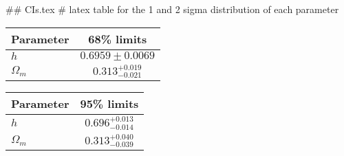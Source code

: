 ## CIs.tex
# latex table for the 1 and 2 sigma distribution of each parameter

\begin{tabular} { l  c}
 Parameter &  68\% limits\\
\hline
{\boldmath$h              $} & $0.6959\pm 0.0069          $\\
{\boldmath$\Omega_m       $} & $0.313^{+0.019}_{-0.021}   $\\
\hline
\end{tabular}

\begin{tabular} { l  c}
 Parameter &  95\% limits\\
\hline
{\boldmath$h              $} & $0.696^{+0.013}_{-0.014}   $\\
{\boldmath$\Omega_m       $} & $0.313^{+0.040}_{-0.039}   $\\
\hline
\end{tabular}
